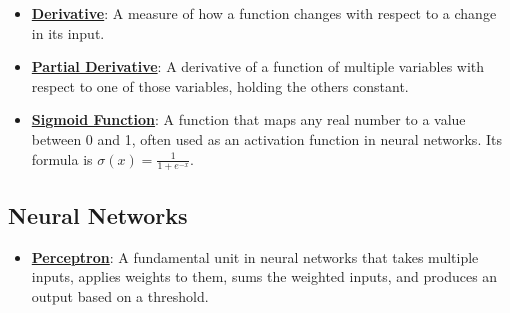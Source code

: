 \documentclass{article}%
\begin{document}
\begin{itemize}[leftmargin=*]
\item \href{https://purdue.brightspace.com/d2l/common/assets/pdfjs-d2l-dist/1.0.14-legacy/web/viewer.html?file=%2Fcontent%2Fenforced%2F1095467-wl.202510.CS.24300.001%2F04L1-Linear Algebra Primer.pdf%3Fou%3D1095467&lang=en-us&container=d2l-fileviewer-rendered-pdf&fullscreen=d2l-fileviewer-rendered-pdf-dialog&height=667#page=21}{\textbf{Derivative}}: A measure of how a function changes with respect to a change in its input.%
\item \href{https://purdue.brightspace.com/d2l/common/assets/pdfjs-d2l-dist/1.0.14-legacy/web/viewer.html?file=%2Fcontent%2Fenforced%2F1095467-wl.202510.CS.24300.001%2F04L1-Linear Algebra Primer.pdf%3Fou%3D1095467&lang=en-us&container=d2l-fileviewer-rendered-pdf&fullscreen=d2l-fileviewer-rendered-pdf-dialog&height=667#page=19}{\textbf{Partial Derivative}}: A derivative of a function of multiple variables with respect to one of those variables, holding the others constant.%
\item \href{https://purdue.brightspace.com/d2l/common/assets/pdfjs-d2l-dist/1.0.14-legacy/web/viewer.html?file=%2Fcontent%2Fenforced%2F1095467-wl.202510.CS.24300.001%2F04L1-Linear Algebra Primer.pdf%3Fou%3D1095467&lang=en-us&container=d2l-fileviewer-rendered-pdf&fullscreen=d2l-fileviewer-rendered-pdf-dialog&height=667#page=21}{\textbf{Sigmoid Function}}: A function that maps any real number to a value between 0 and 1, often used as an activation function in neural networks. Its formula is $\sigma(x) = \frac{1}{1 + e^{-x}}$.%
\end{itemize}

%
\subsection{Neural Networks}%
\label{subsec:NeuralNetworks}%
\begin{itemize}[leftmargin=*]%
\item \href{https://purdue.brightspace.com/d2l/common/assets/pdfjs-d2l-dist/1.0.14-legacy/web/viewer.html?file=%2Fcontent%2Fenforced%2F1095467-wl.202510.CS.24300.001%2F02L2-Intro.pdf%3Fou%3D1095467&lang=en-us&container=d2l-fileviewer-rendered-pdf&fullscreen=d2l-fileviewer-rendered-pdf-dialog&height=667#page=45}{\textbf{Perceptron}}: A fundamental unit in neural networks that takes multiple inputs, applies weights to them, sums the weighted inputs, and produces an output based on a threshold.%
\end{itemize}

%
\end{document}
